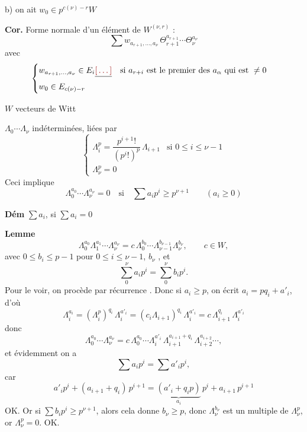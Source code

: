 \documentclass[11pt,a4paper]{article}
\begin{document}
b) on ait $w_0 \in p^{c(\nu) - r} W$

\textbf{Cor.} \quad Forme normale d'un élément de $W^{(\nu, r)}$ :
\[
\sum w_{a_{r+1}, \dots, a_\nu}\, \Theta_{r+1}^{a_{r+1}} \cdots \Theta_\nu^{a_\nu}
\]
avec
\[
\begin{cases}
w_{a_{r+1}, \dots, a_\nu} \in E_i\struck{\ill{}} \quad \text{si $a_{r+i}$ est le premier des $a_\alpha$ qui est } \neq 0 \\
w_0 \in E_{c(\nu) - r}
\end{cases}
\]


$W$ vecteurs de Witt

$\Lambda_0 \cdots \Lambda_\nu$ indéterminées, liées par
\[
\begin{cases}
\Lambda_i^{p} = \dfrac{p^{i+1}!}{(p^{i}!)^{p}}\,\Lambda_{i+1} & \text{si } 0 \leq i \leq \nu - 1 \\[6pt]
\Lambda_\nu^{p} = 0
\end{cases}
\]
Ceci implique
\[
\Lambda_0^{a_0} \cdots \Lambda_\nu^{a_\nu} = 0 \quad \text{si} \quad \sum a_i p^{i} \geq p^{\nu+1} \qquad (a_i \geq 0)
\]

 \textbf{Dém}  $\sum a_i$, \ill{} si
$\sum a_i = 0$ \ill{} 

\textbf{Lemme}
\[
\Lambda_0^{a_0}\Lambda_1^{a_1} \cdots \Lambda_\nu^{a_\nu}
= c\,\Lambda_0^{b_0} \cdots \Lambda_{\nu-1}^{b_{\nu-1}}\Lambda_\nu^{b_\nu}, \qquad c \in W,
\]
avec $0 \leq b_i \leq p-1$ pour $0 \leq i \leq \nu - 1$, $b_\nu$ , et
\[
\sum_0^{\nu} a_i p^{i} = \sum_0^{\nu} b_i p^{i} .
\]
Pour le voir, on procède par récurrence 
 \ill{}. Donc si \ill{} $a_i \geq p$,
on écrit $a_i = p q_i + a'_i$, d'où
\[
\Lambda_i^{a_i} = (\Lambda_i^{p})^{q_i}\,\Lambda_i^{a'_i}
= (c_i\Lambda_{i+1})^{q_i}\,\Lambda_i^{a'_i}
= c\,\Lambda_{i+1}^{q_i}\,\Lambda_i^{a'_i}
\]
donc
\[
\Lambda_0^{a_0} \cdots \Lambda_\nu^{a_\nu}
= c\,\Lambda_0^{a_0} \cdots \Lambda_i^{a'_i}\,\Lambda_{i+1}^{a_{i+1} + q_i}\,\Lambda_{i+2}^{a_{i+2}} \cdots ,
\]
et évidemment on a
\[
\sum a_i p^{i} = \sum a'_i p^{i} ,
\]
car 
\[
a'_i p^{i} + (a_{i+1} + q_i)\,p^{i+1} = \underbrace{(a'_i + q_i p)}_{a_i}\,p^{i} + a_{i+1}\,p^{i+1}
\]
OK. Or si
$\sum b_i p^{i} \geq p^{\nu+1}$, alors \ill{} cela donne $b_\nu \geq p$, donc
$\Lambda_\nu^{b_\nu}$ est un multiple de $\Lambda_\nu^{p}$, or
$\Lambda_\nu^{p} = 0$. OK.
\end{document}
